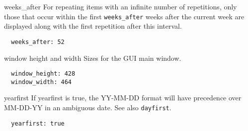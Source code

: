 \documentclass[9pt,landscape]{article}
\begin{document}
\begin{multicols}{3}
\begin{compactdesc}
\item[weeks\_after] For repeating items with an infinite number of repetitions, only those that occur within the first \verb'weeks_after' weeks after the current week are displayed along with the first repetition after this interval.
\begin{verbatim}
  weeks_after: 52
\end{verbatim}

\item[window height and width] Sizes for the GUI main window.
\begin{verbatim}
  window_height: 428
  window_width: 464
\end{verbatim}

\item[yearfirst] If yearfirst is true, the YY-MM-DD format will have precedence over MM-DD-YY in an ambiguous date. See also \verb!dayfirst!.
\begin{verbatim}
  yearfirst: true
\end{verbatim}

\end{compactdesc}

\end{multicols}
\end{document}
